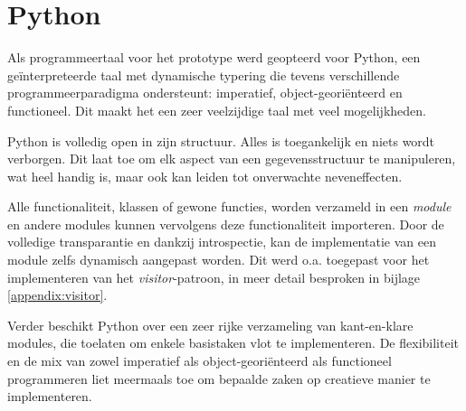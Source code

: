 
\section{Python}
\label{section:devel-python}

Als programmeertaal voor het prototype werd geopteerd voor Python, een
ge\"interpreteerde taal met dynamische typering die tevens verschillende
programmeerparadigma ondersteunt: imperatief, object-geori\"enteerd en
functioneel. Dit maakt het een zeer veelzijdige taal met veel mogelijkheden.

Python is volledig open in zijn structuur. Alles is toegankelijk en niets wordt
verborgen. Dit laat toe om elk aspect van een gegevensstructuur te manipuleren,
wat heel handig is, maar ook kan leiden tot onverwachte neveneffecten.

Alle functionaliteit, klassen of gewone functies, worden verzameld in een
\emph{module} en andere modules kunnen vervolgens deze functionaliteit
importeren. Door de volledige transparantie en dankzij introspectie, kan de
implementatie van een module zelfs dynamisch aangepast worden. Dit werd o.a.
toegepast voor het implementeren van het \emph{visitor}-patroon, in meer detail
besproken in bijlage \ref{appendix:visitor}.

Verder beschikt Python over een zeer rijke verzameling van kant-en-klare
modules, die toelaten om enkele basistaken vlot te implementeren. De
flexibiliteit en de mix van zowel imperatief als object-geori\"enteerd als
functioneel programmeren liet meermaals toe om bepaalde zaken op creatieve
manier te implementeren.
